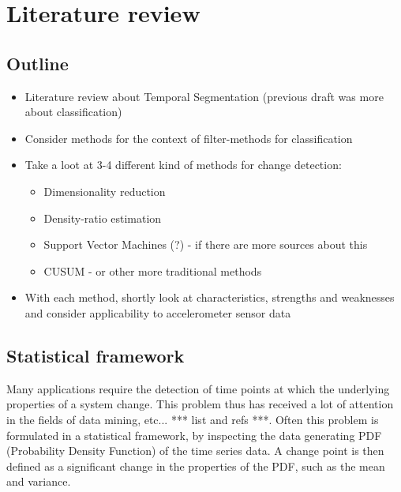 
\chapter{Literature review}

\label{Chapter2} %


\section{Outline}
\begin{itemize}
  \item Literature review about Temporal Segmentation (previous draft was more about classification)
  \item Consider methods for the context of filter-methods for classification
  \item Take a loot at 3-4 different kind of methods for change detection:
    \begin{itemize}
      \item Dimensionality reduction
      \item Density-ratio estimation
      \item Support Vector Machines (?) - if there are more sources about this
      \item CUSUM - or other more traditional methods
    \end{itemize}
  \item With each method, shortly look at characteristics, strengths and weaknesses and consider applicability to accelerometer sensor data
\end{itemize}


\section{Statistical framework}\label{statistical-framework}
Many applications require the detection of time points at which the underlying properties of a system change.
This problem thus has received a lot of attention in the fields of data mining, etc... *** list and refs ***.
Often this problem is formulated in a statistical framework, by inspecting the data generating PDF (Probability Density Function) of the time series data.
A change point is then defined as a significant change in the properties of the PDF, such as the mean and variance.

